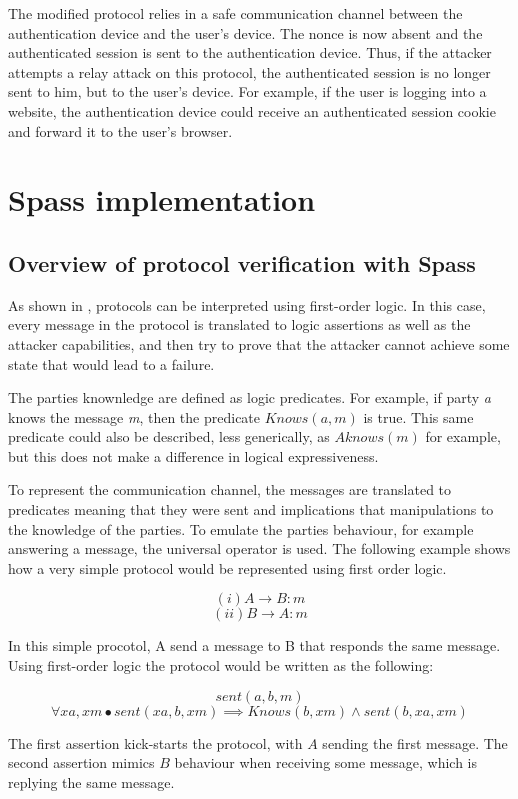 \documentclass{article}
\begin{document}
	The modified protocol relies in a safe communication channel between
	the authentication device and the user's device. The nonce is now absent
	and the authenticated session is sent to the authentication device. Thus,
	if the attacker attempts a relay attack on this protocol, the authenticated
	session is no longer sent to him, but to the user's device. For example,
	if the user is logging into a website, the authentication device could
	receive an authenticated session cookie and forward it to the user's browser.

\section{Spass implementation}
\subsection{Overview of protocol verification with Spass}
	As shown in \cite{analysis}, 
	protocols can be interpreted using first-order logic. In this case, every message in the protocol
	is translated to logic assertions as well as the attacker capabilities, and then try to prove that the
	attacker cannot achieve some state that would lead to a failure.

	The parties knownledge are defined as logic predicates. For example, if party \emph{a} knows the message
	\emph{m}, then the predicate $Knows(a,m)$ is true. This same predicate could also be described, less 
	generically, as $Aknows(m)$ for example, but this does not make a difference in logical expressiveness.

	To represent the communication channel, the messages are translated to predicates meaning that they were
	sent and implications that manipulations to the knowledge of the parties. To emulate the parties behaviour,
	for example answering a message, the universal operator is used. The following example shows how a very simple
	protocol would be represented using first order logic. 

	$$ (i) A \rightarrow B:m  $$
	$$ (ii) B \rightarrow A:m $$

	In this simple procotol, A send a message to B that responds the same message. Using first-order logic the protocol
	would be written as the following:

	$$ sent(a,b,m) $$
	$$ \forall xa, xm \bullet  sent(xa,b,xm) \implies Knows(b, xm) \land  sent(b, xa, xm)$$

	The first assertion kick-starts the protocol, with $A$ sending the first message. The second assertion mimics $B$ 
	behaviour when receiving some message, which is replying the same message.
\end{document}
